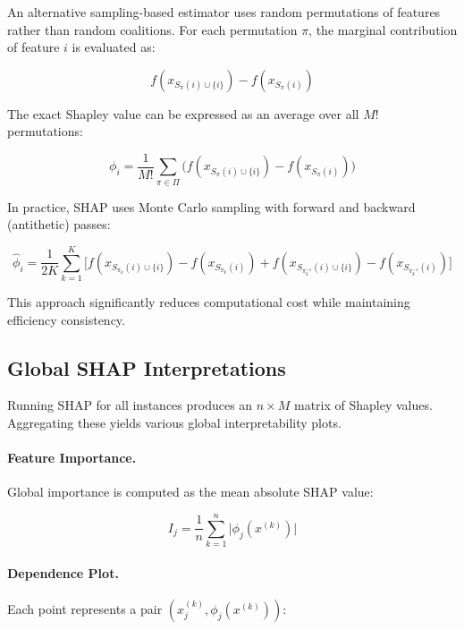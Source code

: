 An alternative sampling-based estimator uses random permutations of features rather than random coalitions.  
For each permutation $\pi$, the marginal contribution of feature $i$ is evaluated as:

\begin{equation}
f(x_{S_\pi(i) \cup \{i\}}) - f(x_{S_\pi(i)})
\end{equation}

The exact Shapley value can be expressed as an average over all $M!$ permutations:

\begin{equation}
\phi_i = \frac{1}{M!} \sum_{\pi \in \Pi}
\Big( f(x_{S_\pi(i) \cup \{i\}}) - f(x_{S_\pi(i)}) \Big)
\end{equation}

In practice, SHAP uses Monte Carlo sampling with forward and backward (antithetic) passes:

\begin{equation}
\hat{\phi}_i = \frac{1}{2K} \sum_{k=1}^{K} 
\Big[
f( x_{S_{\pi_k}(i) \cup \{i\}} ) - f( x_{S_{\pi_k}(i)} )
+ f( x_{S_{\pi_k^{-1}}(i) \cup \{i\}} ) - f( x_{S_{\pi_k^{-1}}(i)} )
\Big]
\end{equation}

This approach significantly reduces computational cost while maintaining efficiency consistency.

\subsection{Global SHAP Interpretations}

Running SHAP for all instances produces an $n \times M$ matrix of Shapley values.  
Aggregating these yields various global interpretability plots.

\paragraph{Feature Importance.}
Global importance is computed as the mean absolute SHAP value:

\begin{equation}
I_j = \frac{1}{n} \sum_{k=1}^{n} \big| \phi_j(x^{(k)}) \big|
\end{equation}

\paragraph{Dependence Plot.}
Each point represents a pair $(x^{(k)}_j, \phi_j(x^{(k)}))$:


